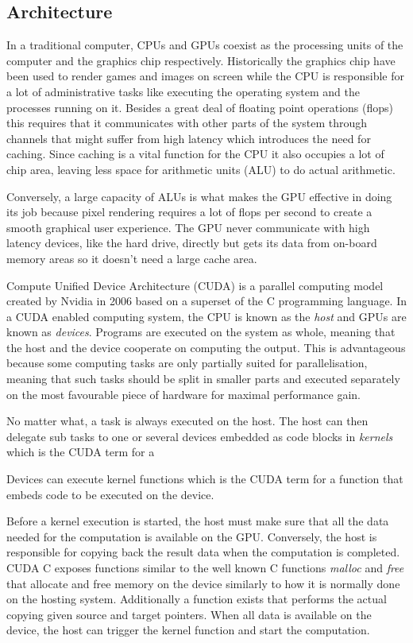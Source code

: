 
\subsection{Architecture}
In a traditional computer, CPUs and GPUs coexist as the processing units of the computer and the graphics chip respectively. Historically the graphics chip have been used to render games and images on screen while the CPU is responsible for a lot of administrative tasks like executing the operating system and the processes running on it. Besides a great deal of floating point operations (flops) this requires that it communicates with other parts of the system through channels that might suffer from high latency which introduces the need for caching. Since caching is a vital function for the CPU it also occupies a lot of chip area, leaving less space for arithmetic units (ALU) to do actual arithmetic. 

Conversely, a large capacity of ALUs is what makes the GPU effective in doing its job because pixel rendering requires a lot of flops per second to create a smooth graphical user experience. The GPU never communicate with high latency devices, like the hard drive, directly but gets its data from on-board memory areas so it doesn't need a large cache area.

Compute Unified Device Architecture (CUDA) is a parallel computing model created by Nvidia in 2006 based on a superset of the C programming language. In a CUDA enabled computing system, the CPU is known as the \emph{host} and GPUs are known as \emph{devices}. Programs are executed on the system as whole, meaning that the host and the device cooperate on computing the output. This is advantageous because some computing tasks are only partially suited for parallelisation, meaning that such tasks should be split in smaller parts and executed separately on the most favourable piece of hardware for maximal performance gain. 

No matter what, a task is always executed on the host. The host can then delegate sub tasks to one or several devices embedded as code blocks in \emph{kernels} which is the CUDA term for a 

Devices can execute kernel functions which is the CUDA term for a function that embeds code to be executed on the device.

Before a kernel execution is started, the host must make sure that all the data needed for the computation is available on the GPU. Conversely, the host is responsible for copying back the result data when the computation is completed. CUDA C exposes functions similar to the well known C functions \emph{malloc} and \emph{free} that allocate and free memory on the device similarly to how it is normally done on the hosting system. Additionally a function exists that performs the actual copying given source and target pointers. When all data is available on the device, the host can trigger the kernel function and start the computation.

